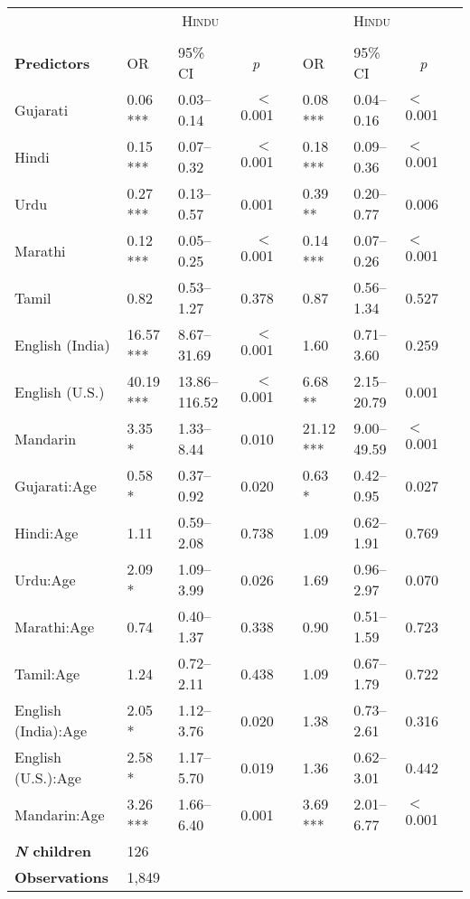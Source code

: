 \begin{table}[ht]
\begin{threeparttable}
\begin{tabular}{lllrllllr}
& \multicolumn{3}{c}{\textsc{Hindu}\tnote{a}} & & \multicolumn{3}{c}{\textsc{Hindu}\tnote{a}} \\
\cline{2-4} \cline{6-8} \\[-.75em]
\textbf{Predictors} & OR & 95\% CI & \multicolumn{1}{c}{\textit{p}} & & OR & 95\% CI & \multicolumn{1}{c}{\textit{p}} \\ 
\midrule
Gujarati & 0.06 *** & 0.03--0.14 & $<$0.001 &  & 0.08 *** & 0.04--0.16 & $<$0.001 \\ 
Hindi & 0.15 *** & 0.07--0.32 & $<$0.001 &  & 0.18 *** & 0.09--0.36 & $<$0.001 \\ 
Urdu & 0.27 *** & 0.13--0.57 & 0.001 &  & 0.39 ** & 0.20--0.77 & 0.006 \\ 
Marathi & 0.12 *** & 0.05--0.25 & $<$0.001 &  & 0.14 *** & 0.07--0.26 & $<$0.001 \\ 
Tamil & 0.82 & 0.53--1.27 & 0.378 &  & 0.87 & 0.56--1.34 & 0.527 \\ 
English (India) & 16.57 *** & 8.67--31.69 & $<$0.001 &  & 1.60 & 0.71--3.60 & 0.259 \\ 
English (U.S.) & 40.19 *** & 13.86--116.52 & $<$0.001 &  & 6.68 ** & 2.15--20.79 & 0.001 \\ 
Mandarin & 3.35 * & 1.33--8.44 & 0.010 &  & 21.12 *** & 9.00--49.59 & $<$0.001 \\ 
Gujarati:Age\tnote{b} & 0.58 * & 0.37--0.92 & 0.020 &  & 0.63 * & 0.42--0.95 & 0.027 \\ 
Hindi:Age\tnote{b} & 1.11 & 0.59--2.08 & 0.738 &  & 1.09 & 0.62--1.91 & 0.769 \\ 
Urdu:Age\tnote{b} & 2.09 * & 1.09--3.99 & 0.026 &  & 1.69 & 0.96--2.97 & 0.070 \\ 
Marathi:Age\tnote{b} & 0.74 & 0.40--1.37 & 0.338 &  & 0.90 & 0.51--1.59 & 0.723 \\ 
Tamil:Age\tnote{b} & 1.24 & 0.72--2.11 & 0.438 &  & 1.09 & 0.67--1.79 & 0.722 \\ 
English (India):Age\tnote{b} & 2.05 * & 1.12--3.76 & 0.020 &  & 1.38 & 0.73--2.61 & 0.316 \\ 
English (U.S.):Age\tnote{b} & 2.58 * & 1.17--5.70 & 0.019 &  & 1.36 & 0.62--3.01 & 0.442 \\ 
Mandarin:Age\tnote{b} & 3.26 *** & 1.66--6.40 & 0.001 &  & 3.69 *** & 2.01--6.77 & $<$0.001 \\ 
\midrule
\bfseries{\textit{N} children}\tnote{c} & 126   &  &  &  &  &  &  \\
\textbf{Observations}\tnote{d} & 1,849  &  &  &  &  &  &  \\

\end{tabular}
\end{threeparttable}
\end{table}
